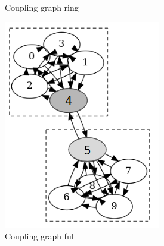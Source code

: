 \begin{figure}[!htb]
\begin{subfigure}{0.2\linewidth}
        \caption{Coupling graph ring}
        \label{fig:coupling-graph-ring}
    \end{subfigure}
    \hfill
    \begin{subfigure}{0.25\linewidth}
        \includegraphics[width=\linewidth]{image/coupling_graph_full.png}
        \caption{Coupling graph full}
        \label{fig:coupling-graph-full}
    \end{subfigure}
    \hfill
    \begin{subfigure}{0.4\linewidth}

\end{subfigure}
\end{figure}
